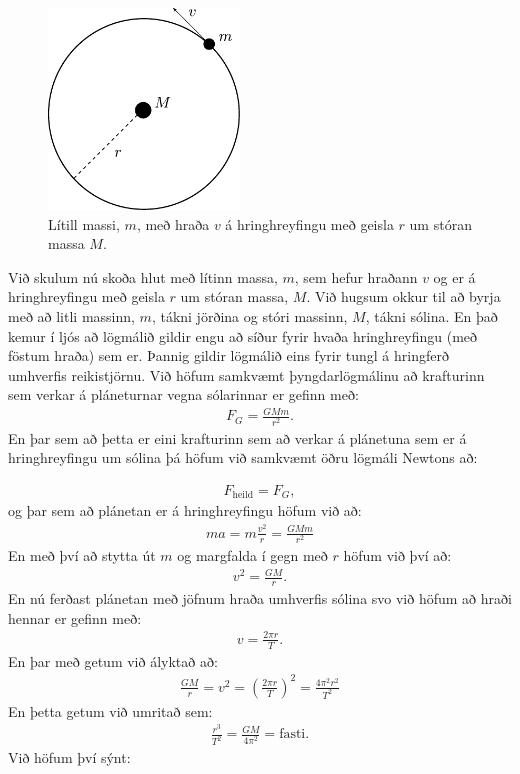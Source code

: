 \begin{minipage}{\linewidth}
\begin{figure}
\vspace{-1cm}
\centering
\includegraphics[width=2in]{figures/planets.pdf}
\caption{Lítill massi, $m$, með hraða $v$ á hringhreyfingu með geisla $r$ um stóran massa $M$.}
\label{fig:hringhreyfing}
\end{figure}

Við skulum nú skoða hlut með lítinn massa, $m$, sem hefur hraðann $v$ og er á hringhreyfingu með geisla $r$ um stóran massa, $M$. Við hugsum okkur til að byrja með að litli massinn, $m$, tákni jörðina og stóri massinn, $M$, tákni sólina. En það kemur í ljós að lögmálið gildir engu að síður fyrir hvaða hringhreyfingu (með föstum hraða) sem er. Þannig gildir lögmálið eins fyrir tungl á hringferð umhverfis reikistjörnu. Við höfum samkvæmt þyngdarlögmálinu að krafturinn sem verkar á pláneturnar vegna sólarinnar er gefinn með:
\begin{align*}
    F_G = \frac{GMm}{r^2}.
\end{align*}
En þar sem að þetta er eini krafturinn sem að verkar á plánetuna sem er á hringhreyfingu um sólina þá höfum við samkvæmt öðru lögmáli Newtons að:
\end{minipage}
\begin{align*}
    F_{\text{heild}} = F_G,
\end{align*}
og þar sem að plánetan er á hringhreyfingu höfum við að:
\begin{align*}
    ma = m \frac{v^2}{r} = \frac{GMm}{r^2}
\end{align*}
En með því að stytta út $m$ og margfalda í gegn með $r$ höfum við því að:
\begin{align*}
    v^2 = \frac{GM}{r}.
\end{align*}
En nú ferðast plánetan með jöfnum hraða umhverfis sólina svo við höfum að hraði hennar er gefinn með:
\begin{align*}
    v = \frac{2\pi r}{T}.
\end{align*}
En þar með getum við ályktað að:
\begin{align*}
    \frac{GM}{r} = v^2 =  \left( \frac{2\pi r}{T} \right)^2 = \frac{4\pi^2r^2}{T^2}
\end{align*}
En þetta getum við umritað sem:
\begin{align*}
    \frac{r^3}{T^2} = \frac{GM}{4\pi^2} = \text{fasti}.
\end{align*}
Við höfum því sýnt:

